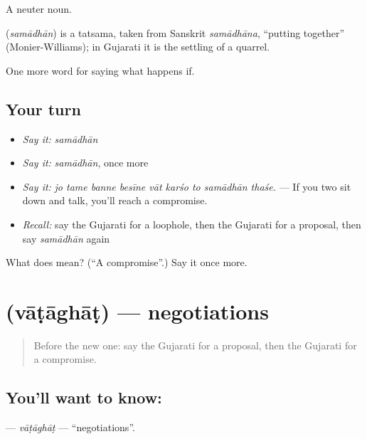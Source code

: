 A neuter noun.

\begin{cousinweb}
\textbf{} (\emph{samādhān}) is a tatsama, taken from Sanskrit \emph{samādhāna}, \textquotedblleft{}putting together\textquotedblright{} (Monier-Williams); in Gujarati it is the settling of a quarrel.
\end{cousinweb}

\begin{grammarlens}[title={What you've built}]
One more word for saying what happens if.
\end{grammarlens}

\subsection*{Your turn}
\begin{itemize}
\raggedright
  \item \emph{Say it:} \emph{samādhān}
  \item \emph{Say it:} \emph{samādhān}, once more
  \item \emph{Say it:} \emph{jo tame banne besīne vāt karśo to samādhān thaśe.} — If you two sit down and talk, you'll reach a compromise.
  \item \emph{Recall:} say the Gujarati for a loophole, then the Gujarati for a proposal, then say \emph{samādhān} again
\end{itemize}

\begin{tcolorbox}[breakable,colback=teal!4,colframe=teal!35!black,title={Before you move on}]
What does  mean? (\textquotedblleft{}A compromise\textquotedblright{}.) Say it once more.
\end{tcolorbox}
\section[\texorpdfstring{\gu{વાટાઘાટ} (vāṭāghāṭ)}{વાટાઘાટ (vāṭāghāṭ)}]{ (vāṭāghāṭ) — negotiations}

\label{lesson:GU-C542-vataghat}



\begin{quote}
Before the new one: say the Gujarati for a proposal, then the Gujarati for a compromise.
\end{quote}

\subsection*{You'll want to know: }
\textbf{} — \emph{vāṭāghāṭ} — \textquotedblleft{}negotiations\textquotedblright{}.

